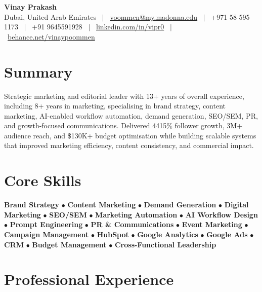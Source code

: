 \documentclass[10pt,a4paper]{article}
\begin{document}
\begin{center}
{\Large\bfseries Vinay Prakash}\\[0.25em]
\small Dubai, United Arab Emirates \ $|$ \ 
\href{mailto:voommen@my.madonna.edu}{voommen@my.madonna.edu} \ $|$ \ 
+971 58 595 1173 \ $|$ \ 
+91 9645591928 \ $|$ \ 
\href{https://linkedin.com/in/vipr0}{linkedin.com/in/vipr0} \ $|$ \ 
\href{https://behance.net/vinaypoommen}{behance.net/vinaypoommen}
\end{center}
\vspace{-4pt}

\section{Summary}
\small{Strategic marketing and editorial leader with 13+ years of overall experience, including 8+ years in marketing, specialising in brand strategy, content marketing, AI-enabled workflow automation, demand generation, SEO/SEM, PR, and growth-focused communications. Delivered 4415\% follower growth, 3M+ audience reach, and \$130K+ budget optimisation while building scalable systems that improved marketing efficiency, content consistency, and commercial impact.}

\section{Core Skills}
\small{\textbf{Brand Strategy} $\bullet$ \textbf{Content Marketing} $\bullet$ \textbf{Demand Generation} $\bullet$ \textbf{Digital Marketing} $\bullet$ \textbf{SEO/SEM} $\bullet$ \textbf{Marketing Automation} $\bullet$ \textbf{AI Workflow Design} $\bullet$ \textbf{Prompt Engineering} $\bullet$ \textbf{PR \& Communications} $\bullet$ \textbf{Event Marketing} $\bullet$ \textbf{Campaign Management} $\bullet$ \textbf{HubSpot} $\bullet$ \textbf{Google Analytics} $\bullet$ \textbf{Google Ads} $\bullet$ \textbf{CRM} $\bullet$ \textbf{Budget Management} $\bullet$ \textbf{Cross-Functional Leadership}}

\section{Professional Experience}
\end{document}
